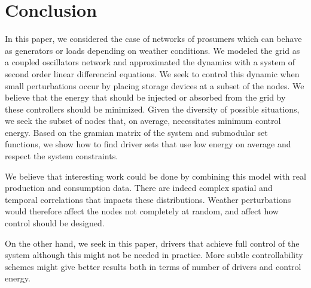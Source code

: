 \documentclass[conference]{IEEEtran}
\begin{document}


\section{Conclusion}
\label{sec:Conclusion}
In this paper, we considered the case of networks of prosumers which can behave as generators or loads depending on weather conditions. We modeled the grid as a coupled oscillators network and approximated the dynamics with a system of second order linear differencial equations. We seek to control this dynamic when small perturbations occur by placing storage devices at a subset of the nodes. We believe that the energy that should be injected or absorbed from the grid by these controllers should be minimized. Given the diversity of possible situations, we seek the subset of nodes that, on average, necessitates minimum control energy. Based on the gramian matrix of the system and submodular set functions, we show how to find driver sets that use low energy on average and respect the system constraints. 

We believe that interesting work could be done by combining this model with real production and consumption data. There are indeed complex spatial and temporal correlations that impacts these distributions. Weather perturbations would therefore affect the nodes not completely at random, and affect how control should be designed. 

On the other hand, we seek in this paper, drivers that achieve full control of the system although this might not be needed in practice. More subtle controllability schemes might give better results both in terms of number of drivers and control energy.

  

\end{document}
